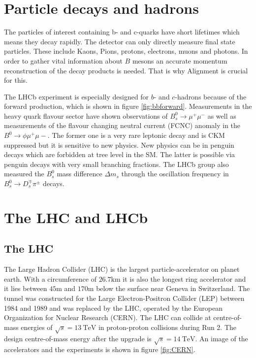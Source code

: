 \section{Particle decays and hadrons}
\label{sec:decays}

The particles of interest containing b- and c-quarks have short lifetimes which means they decay rapidly. The detector can only directly measure final state particles. These include Kaons, Pions, protons, electrons, muons and photons.
In order to gather vital information about $B$ mesons an accurate momentum reconstruction of the decay products is needed. That is why Alignment is crucial for this.

The LHCb experiment is especially designed for $\textit{b}$- and $\textit{c}$-hadrons because of the forward production, which is shown in figure \ref{fig:bbforward}.
Measurements in the heavy quark flavour sector have shown observations of $\textit{B}_s^0 \to \mu^{+} \mu^{-}$ \cite{Bmumu} as well as measurements of the flavour changing neutral current (FCNC) anomaly in the
$\textit{B}^0 \to \phi \mu^{+} \mu{-}$.
The former one is a very rare leptonic decay and is CKM suppressed but it is sensitive to new physics.
New physics can be in penguin decays which are forbidden at tree level in the SM.
The latter is possible via penguin decays with very small branching fractions\cite{bsll}. The LHCb group also measured the $\textit{B}_s^0$ mass difference\cite{massdiff} $\Delta m_s$ through the oscillation frequency in $\textit{B}_s^0 \to \textit{D}_s^{\mp} \pi^{\pm}$ decays.

\section{The LHC and LHCb}
\label{sec:lhcandB}

\subsection{The LHC}
The Large Hadron Collider (LHC)\cite{lhcInfo} is the largest particle-accelerator on planet earth. With a circumference of $26.7\si{\kilo\metre}$ it is also the longest ring accelerator and it lies between $45\si{\metre}$ and $170\si{\metre}$ below the surface near Geneva in Switzerland. The tunnel was constructed for the Large Electron-Positron Collider (LEP) between 1984 and 1989 and was replaced by the LHC, operated by the European Organization for Nuclear Research (CERN). The LHC can collide at centre-of-mass energies of $\sqrt{s} = \SI{13}{\tera\electronvolt}$ in proton-proton collisions during Run 2. The design centre-of-mass energy after the upgrade is $\sqrt{s} = \SI{14}{\tera\electronvolt}$.\cite{LHCDR}
An image of the accelerators and the experiments is shown in figure \ref{fig:CERN}.

